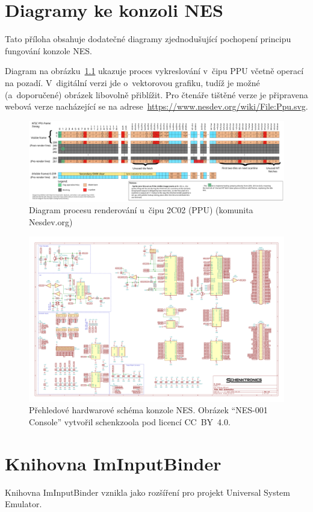 \chapter{Diagramy ke konzoli NES}
\label{apx:ppu}

Tato příloha obsahuje dodatečné diagramy zjednodušující pochopení principu fungování konzole NES.

Diagram na obrázku~\ref{ppu:renderovani} ukazuje proces vykreslování v~čipu PPU včetně operací na pozadí. V~digitální verzi jde o~vektorovou grafiku, tudíž je možné (a~doporučené) obrázek libovolně přiblížit. Pro čtenáře tištěné verze je připravena webová verze nacházející se na adrese~\url{https://www.nesdev.org/wiki/File:Ppu.svg}.

\begin{figure}[p]
	\centering
	\caption{Diagram procesu renderování u~čipu 2C02 (PPU) (komunita Nesdev.org)}
	\label{ppu:renderovani}
	\includegraphics[width=1\textheight, angle=270]{images/ppudiag.pdf}
\end{figure}

\begin{figure}[p]
	\centering
	\caption{Přehledové hardwarové schéma konzole NES. Obrázek \enquote{NES-001 Console} vytvořil schenkzoola pod licencí CC~BY~4.0.}
	\label{fig:nes001-hw}
	\includegraphics[width=0.95\textheight, angle=270]{images/NES-001.pdf}
\end{figure}

\chapter{Knihovna ImInputBinder}
\label{apx:binder}

Knihovna ImInputBinder vznikla jako rozšíření pro projekt Universal System Emulator.


